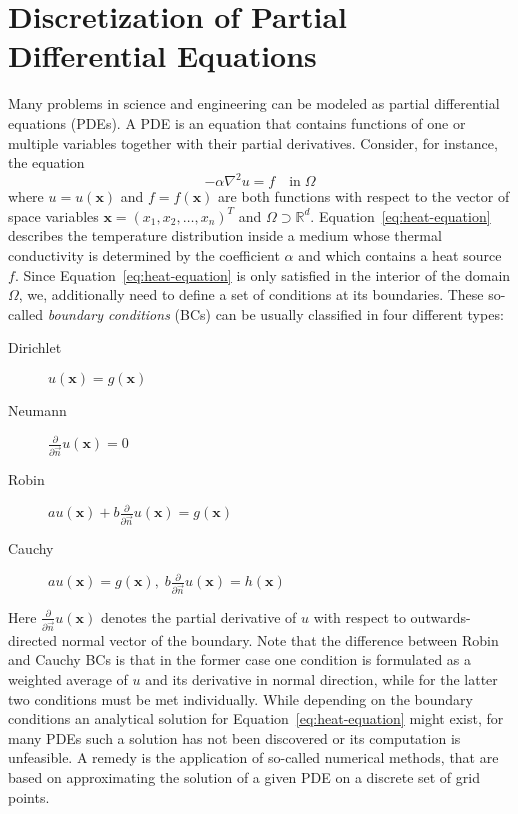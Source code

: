 \section{Discretization of Partial Differential Equations}
Many problems in science and engineering can be modeled as partial differential equations (PDEs). %
A PDE is an equation that contains functions of one or multiple variables together with their partial derivatives.
Consider, for instance, the equation
\begin{equation}
	-\alpha \nabla^2 u = f \quad \text{in} \; \Omega 
	\label{eq:heat-equation}
\end{equation}
where $u = u(\bm{x})$ and $f = f(\bm{x})$ are both functions with respect to the vector of space variables $\bm{x} = (x_1, x_2, \dots, x_n)^T$ and $\Omega \supset \mathbb{R}^d$.
Equation~\eqref{eq:heat-equation} describes the temperature distribution inside a medium whose thermal conductivity is determined by the coefficient $\alpha$ and which contains a heat source $f$.
Since Equation~\eqref{eq:heat-equation} is only satisfied in the interior of the domain $\Omega$, we, additionally need to define a set of conditions at its boundaries.
These so-called \emph{boundary conditions} (BCs) can be usually classified in four different types:
\begin{description}
	\item[Dirichlet] $u(\bm{x}) = g(\bm{x})$
	\item[Neumann] $\frac{\partial}{\partial \vec{n}} u(\bm{x}) = 0$
	\item[Robin] $a u(\bm{x}) + b \frac{\partial}{\partial \vec{n}} u(\bm{x}) = g(\bm{x})$
	\item[Cauchy] $a u(\bm{x}) = g(\bm{x}), \; b \frac{\partial}{\partial \vec{n}} u(\bm{x}) = h(\bm{x})$
\end{description}
Here $\frac{\partial}{\partial \vec{n}} u(\bm{x})$ denotes the partial derivative of $u$ with respect to outwards-directed normal vector of the boundary.
Note that the difference between Robin and Cauchy BCs is that in the former case one condition is formulated as a weighted average of $u$ and its derivative in normal direction, while for the latter two conditions must be met individually.
While depending on the boundary conditions an analytical solution for Equation~\eqref{eq:heat-equation} might exist, for many PDEs such a solution has not been discovered or its computation is unfeasible.
A remedy is the application of so-called numerical methods, that are based on approximating the solution of a given PDE on a discrete set of grid points. 
